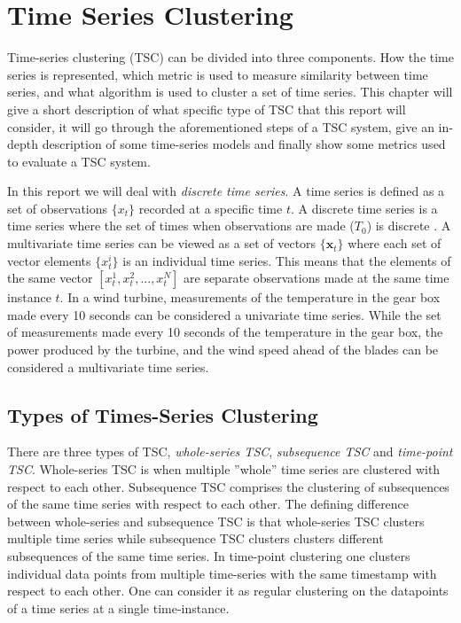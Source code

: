 \newpage
\chapter{Time Series Clustering}
Time-series clustering (TSC) can be divided into three components. How the time series is represented, which metric is used to measure similarity between time series, and what algorithm is used to cluster a set of time series. This chapter will give a short description of what specific type of TSC that this report will consider, it will go through the aforementioned steps of a TSC system, give an in-depth description of some time-series models and finally show some metrics used to evaluate a TSC system. 


In this report we will deal with \textit{discrete time series}. A time series is defined as a set of observations $\{x_t\}$ recorded at a specific time $t$. A discrete time series is a time series where the set of times when observations are made ($T_0$) is discrete \cite{brockwell_davis_advanced}. A multivariate time series can be viewed as a set of vectors $\{\mathbf{x}_t\}$ where each set of vector elements $\{x^i_t\}$ is an individual time series. This means that the elements of the same vector $[x^1_t, x^2_t,...,x^N_t]$ are separate observations made at the same time instance $t$. In a wind turbine, measurements of the temperature in the gear box made every 10 seconds can be considered a univariate time series. While the set of measurements made every 10 seconds of the temperature in the gear box, the power produced by the turbine, and the wind speed ahead of the blades can be considered a multivariate time series.
  

\section{Types of Times-Series Clustering}
There are three types of TSC, \textit{whole-series TSC}, \textit{subsequence TSC} and \textit{time-point TSC}. Whole-series TSC is when multiple ''whole'' time series are clustered with respect to each other. Subsequence TSC comprises the clustering of subsequences of the same time series with respect to each other. The defining difference between whole-series and subsequence TSC is that whole-series TSC clusters multiple time series while subsequence TSC clusters clusters different subsequences of the same time series. In time-point clustering one clusters individual data points from multiple time-series with the same timestamp with respect to each other. One can consider it as regular clustering on the datapoints of a time series at a single time-instance. 

